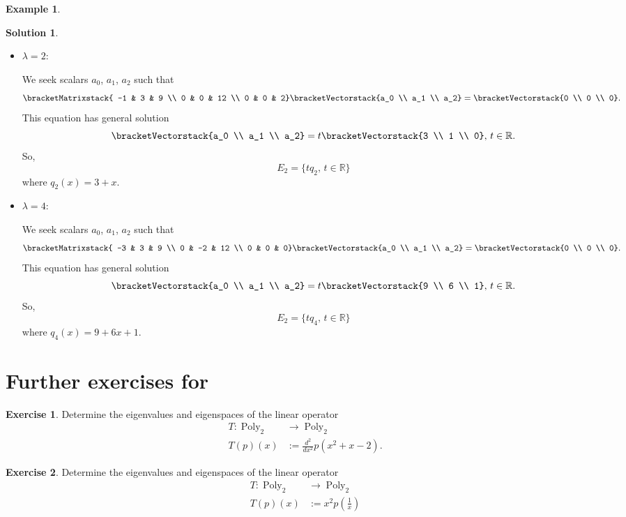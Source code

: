 \documentclass[a4paper,11pt]{book}
\theoremstyle{definition}
\newtheorem{exercise}{Exercise}
\newtheorem{example_environment}{Example}[chapter]
\newtheorem*{solution}{Solution}
\newcommand{\cvector}[1]{\bracketVectorstack{#1}}
\newcommand{\cmatrix}[1]{\bracketMatrixstack{#1}}
\newcommand{\furtherexercises}{\section*{Further exercises for \thesection}}
\newenvironment{example}
	{
		\begin{oframed} 
		\begin{example_environment}
	}
	{
		\end{example_environment}
		\end{oframed}
	}
\DeclareMathOperator{\Poly}{Poly}
\begin{document}
\begin{example}
\begin{solution}
\begin{itemize}
\item $\lambda = 2$:

We seek scalars $a_0$, $a_1$, $a_2$ such that
\[
 \cmatrix{ -1 & 3 & 9 \\
 0 & 0  & 12 \\
 0 & 0 & 2} \cvector{a_0 \\ a_1 \\ a_2} = \cvector{0 \\ 0 \\ 0}.
\]
This equation has general solution
\[
 \cvector{a_0 \\ a_1 \\ a_2} = t \cvector{3 \\ 1 \\ 0}, \, t \in \mathbb{R}.
\]
So,
\[
 E_2 = \{t q_2 , \, t \in \mathbb{R} \}
\]
where $q_2(x) = 3 + x$.

\item $\lambda = 4$:

We seek scalars $a_0$, $a_1$, $a_2$ such that
\[
 \cmatrix{ -3 & 3 & 9 \\
 0 & -2  & 12 \\
 0 & 0 & 0} \cvector{a_0 \\ a_1 \\ a_2} = \cvector{0 \\ 0 \\ 0}.
\]
This equation has general solution
\[
 \cvector{a_0 \\ a_1 \\ a_2} = t \cvector{9 \\ 6 \\ 1}, \, t \in \mathbb{R}.
\]
So,
\[
 E_2 = \{t q_4 , \, t \in \mathbb{R} \}
\]
where $q_4(x) = 9 + 6x + 1$.
\end{itemize}

\end{solution}

\end{example}


\furtherexercises
\begin{exercise} Determine the eigenvalues and eigenspaces of the linear operator
\begin{align*}
 T : \Poly_2 & \rightarrow \Poly_2 \\
     T(p)(x) & := \frac{d^2}{dx^2} p(x^2 + x - 2).
\end{align*}
\end{exercise}

\begin{exercise} Determine the eigenvalues and eigenspaces of the linear operator
\begin{align*}
 T : \Poly_2 & \rightarrow \Poly_2 \\
     T(p)(x) & := x^2 p\left(\frac{1}{x}\right)
\end{align*}

\end{exercise}
\end{document}
